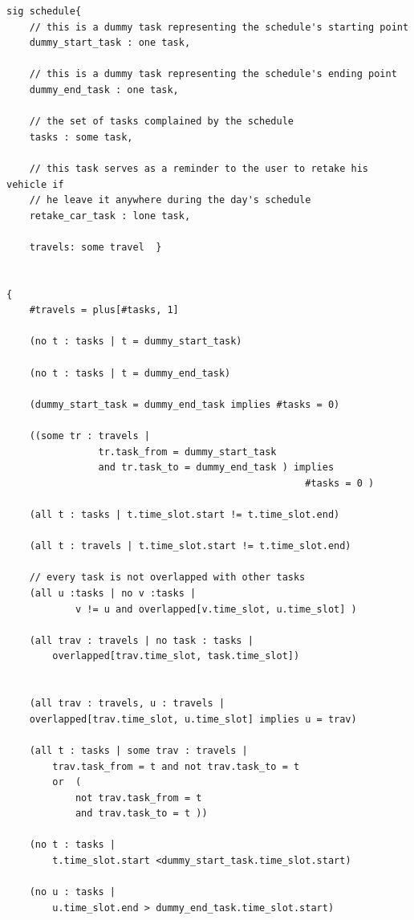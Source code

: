 \begin{verbatim}
sig schedule{
    // this is a dummy task representing the schedule's starting point
    dummy_start_task : one task,
    
    // this is a dummy task representing the schedule's ending point
    dummy_end_task : one task,
    
    // the set of tasks complained by the schedule 
    tasks : some task,
	
    // this task serves as a reminder to the user to retake his vehicle if
    // he leave it anywhere during the day's schedule
    retake_car_task : lone task,
	
    travels: some travel  }
    
    
{
    #travels = plus[#tasks, 1]

    (no t : tasks | t = dummy_start_task)  		
																	
    (no t : tasks | t = dummy_end_task)		

    (dummy_start_task = dummy_end_task implies #tasks = 0)

    ((some tr : travels |
                tr.task_from = dummy_start_task 
                and tr.task_to = dummy_end_task ) implies
    			                                    #tasks = 0 ) 																														

    (all t : tasks | t.time_slot.start != t.time_slot.end)																											

    (all t : travels | t.time_slot.start != t.time_slot.end)
																											
    // every task is not overlapped with other tasks
    (all u :tasks | no v :tasks | 
            v != u and overlapped[v.time_slot, u.time_slot]	)
            
    (all trav : travels | no task : tasks |
        overlapped[trav.time_slot, task.time_slot])	
        
    
    (all trav : travels, u : travels |
    overlapped[trav.time_slot, u.time_slot] implies u = trav)
    
    (all t : tasks | some trav : travels | 
        trav.task_from = t and not trav.task_to = t 
        or  (
            not trav.task_from = t 
            and trav.task_to = t ))
            
    (no t : tasks | 
        t.time_slot.start <dummy_start_task.time_slot.start)
        
    (no u : tasks | 
        u.time_slot.end > dummy_end_task.time_slot.start)
        

\end{verbatim}
